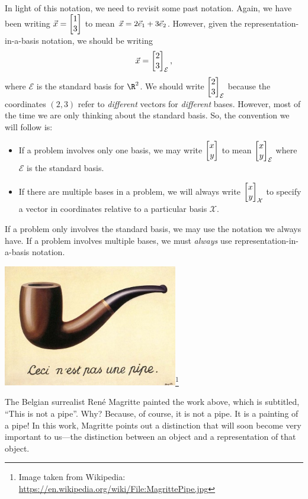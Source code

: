 In light of this notation, we need to revisit some past notation. Again, we have been writing $\vec x=\mat{1\\3}$ to mean
$\vec x=2{\vec e_1}+3{\vec e_2}$. However, given the representation-in-a-basis notation, we should be writing
\[
	\vec x=\mat{2\\3}_{\mathcal E},
\]
where $\mathcal E$ is the standard basis for $\R^2$. We should write $\mat{2\\3}_{\mathcal E}$ because the coordinates $(2,3)$
refer to \emph{different} vectors for \emph{different} bases. However, most of the time we are only thinking about the standard
basis. So, the convention we will follow is:
\begin{itemize}
	\item If a problem involves only one basis, we may write $\mat{x\\y}$ to mean $\mat{x\\y}_{\mathcal E}$ where
	$\mathcal E$ is the standard basis.
	\item If there are multiple bases in a problem, we will always write $\mat{x\\y}_{\mathcal X}$ to specify a vector in
	coordinates relative to a particular basis $\mathcal X$.
\end{itemize}

\begin{emphbox}[Takeaway]
	If a problem only involves the standard basis, we may use the notation we always have. If a problem involves
	multiple bases, we must \emph{always} use representation-in-a-basis notation.
\end{emphbox}



\begin{center}
\includegraphics[width=3in]{images/MagrittePipe.jpg}\footnote{Image taken from Wikipedia: \url{https://en.wikipedia.org/wiki/File:MagrittePipe.jpg}} 
\end{center}
The Belgian surrealist Ren\'e Magritte painted the work above, which is subtitled, ``This is not a pipe''. Why? Because, of course, it is not
a pipe. It is a painting of a pipe! In this work, Magritte points out a distinction that will soon become very important to
us---the distinction between an object and a representation of that object.



